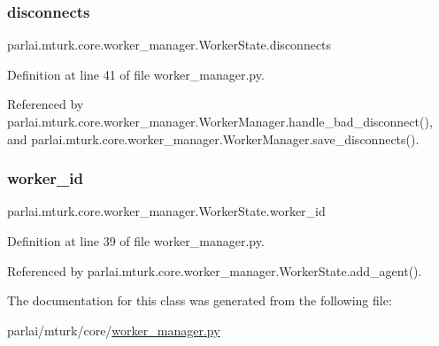 \subsubsection{\texorpdfstring{disconnects}{disconnects}}
{\footnotesize\ttfamily parlai.\+mturk.\+core.\+worker\+\_\+manager.\+Worker\+State.\+disconnects}



Definition at line 41 of file worker\+\_\+manager.\+py.



Referenced by parlai.\+mturk.\+core.\+worker\+\_\+manager.\+Worker\+Manager.\+handle\+\_\+bad\+\_\+disconnect(), and parlai.\+mturk.\+core.\+worker\+\_\+manager.\+Worker\+Manager.\+save\+\_\+disconnects().

\mbox{\label{classparlai_1_1mturk_1_1core_1_1worker__manager_1_1WorkerState_a5cb2de9dfc1d8d0b07f693a9e6fabe72}} 
\subsubsection{\texorpdfstring{worker\+\_\+id}{worker\_id}}
{\footnotesize\ttfamily parlai.\+mturk.\+core.\+worker\+\_\+manager.\+Worker\+State.\+worker\+\_\+id}



Definition at line 39 of file worker\+\_\+manager.\+py.



Referenced by parlai.\+mturk.\+core.\+worker\+\_\+manager.\+Worker\+State.\+add\+\_\+agent().



The documentation for this class was generated from the following file\+:\begin{DoxyCompactItemize}
\item 
parlai/mturk/core/\hyperlink{worker__manager_8py}{worker\+\_\+manager.\+py}\end{DoxyCompactItemize}
